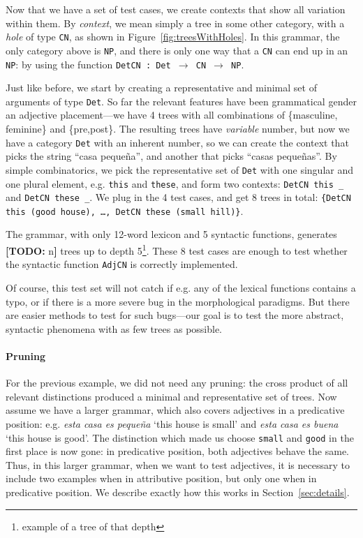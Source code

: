 \documentclass[11pt]{article}
\def\t#1{\texttt{#1}}
\newcommand{\todo}[1]{{\color{cyan}\textbf{[TODO: }#1\textbf{]}}}
\begin{document}
Now that we have a set of test cases, we create contexts that show all variation within them.
By \emph{context}, we mean simply a tree in some other category, with a \emph{hole} of type \t{CN}, as shown in Figure~\ref{fig:treesWithHoles}.
In this grammar, the only category above is \t{NP}, and there is only one way that a \t{CN} can end up in an \t{NP}: by using the function \t{DetCN : Det $\rightarrow$ CN $\rightarrow$ NP}.

Just like before, we start by creating a representative and minimal set of arguments of type \t{Det}. So far the relevant features have been grammatical gender an adjective placement---we have 4 trees with all combinations of \{masculine, feminine\} and \{pre,post\}. The resulting trees have \emph{variable} number, but now we have a category \t{Det} with an inherent number, so we can create the context that picks the string ``casa  peque\~{n}a'', and another that picks ``casas  peque\~{n}as''. By simple combinatorics, we pick the representative set of \t{Det} with one singular and one plural element, e.g. \t{this} and \t{these}, and form two contexts: \verb|DetCN this _| and  \verb|DetCN these _|. We plug in the 4 test cases, and get 8 trees in total: \t{\{DetCN this (good house), \dots, DetCN these (small hill)\}}.


The grammar, with only 12-word lexicon and 5 syntactic functions, generates \todo{n} trees up to depth 5\footnote{example of a tree of that depth}. These 8 test cases are enough to test whether the syntactic function \t{AdjCN} is correctly implemented.  

Of course, this test set will not catch if e.g. any of the lexical functions contains a typo, or if there is a more severe bug in the morphological paradigms. But there are easier methods to test for such bugs---our goal is to test the more abstract, syntactic phenomena with as few trees as possible.


\paragraph{Pruning}

For the previous example, we did not need any pruning: the cross product of all relevant distinctions produced a minimal and representative set of trees. Now assume we have a larger grammar, which also covers adjectives in a predicative position: e.g. \emph{esta casa es peque\~{n}a} `this house is small' and \emph{esta casa es buena} `this house is good'. The distinction which made us choose \t{small} and \t{good} in the first place is now gone: in predicative position, both adjectives behave the same. Thus, in this larger grammar, when we want to test adjectives, it is necessary to include two examples when in attributive position, but only one when in predicative position. We describe exactly how this works in Section~\ref{sec:details}.
\end{document}
